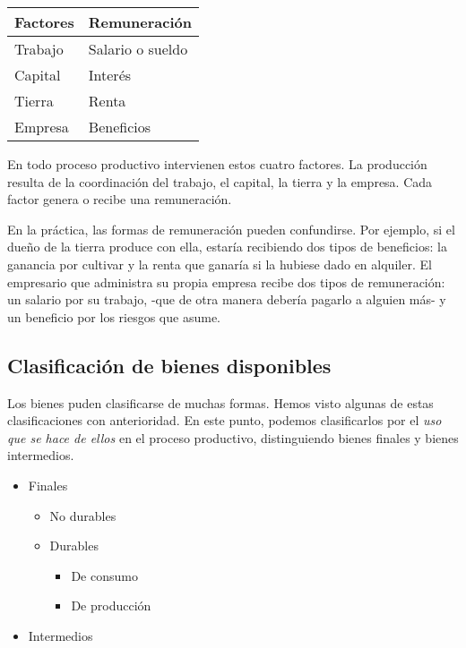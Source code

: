 \vspace{.5cm}
\begin{table}[H]
    \centering
    \begin{tabular}{ll}
        Factores & Remuneración     \\
        \hline
        Trabajo  & Salario o sueldo \\
        Capital  & Interés          \\
        Tierra   & Renta            \\
        Empresa  & Beneficios       \\
        \hline
    \end{tabular}
\end{table}
\vspace{.5cm}

En todo proceso productivo intervienen estos cuatro factores.
La producción resulta de la coordinación del trabajo, 
el capital, la tierra y la empresa.
Cada factor genera o recibe una remuneración.

En la práctica,
las formas de remuneración pueden confundirse.
Por ejemplo,
si el dueño de la tierra produce con ella,
estaría recibiendo dos tipos de beneficios:
la ganancia por cultivar y la renta que ganaría si la hubiese dado en alquiler.
El empresario que administra su propia empresa recibe dos tipos de remuneración:
un salario por su trabajo,
-que de otra manera debería pagarlo a alguien más-
y un beneficio por los riesgos que asume.

\subsection{Clasificación de bienes disponibles}

Los bienes puden clasificarse de muchas formas.
Hemos visto algunas de estas clasificaciones con anterioridad.
En este punto,
podemos clasificarlos por el \textit{uso que se hace de ellos}
en el proceso productivo,
distinguiendo bienes finales y bienes intermedios.

\begin{itemize}
    \item Finales
          \begin{itemize}
              \item No durables
              \item Durables
                    \begin{itemize}
                        \item De consumo
                        \item De producción
                    \end{itemize}
          \end{itemize}
    \item Intermedios
\end{itemize}

